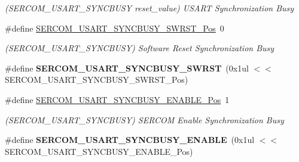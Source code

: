 \begin{DoxyCompactItemize}
\begin{DoxyCompactList}\small\item\em (S\+E\+R\+C\+O\+M\+\_\+\+U\+S\+A\+R\+T\+\_\+\+S\+Y\+N\+C\+B\+U\+S\+Y reset\+\_\+value) U\+S\+A\+R\+T Synchronization Busy \end{DoxyCompactList}\item 
\hypertarget{group___s_a_m_l21___s_e_r_c_o_m_ga02616f7f7ba7269e23c1beee065d41e2}{}\#define \hyperlink{group___s_a_m_l21___s_e_r_c_o_m_ga02616f7f7ba7269e23c1beee065d41e2}{S\+E\+R\+C\+O\+M\+\_\+\+U\+S\+A\+R\+T\+\_\+\+S\+Y\+N\+C\+B\+U\+S\+Y\+\_\+\+S\+W\+R\+S\+T\+\_\+\+Pos}~0\label{group___s_a_m_l21___s_e_r_c_o_m_ga02616f7f7ba7269e23c1beee065d41e2}

\begin{DoxyCompactList}\small\item\em (S\+E\+R\+C\+O\+M\+\_\+\+U\+S\+A\+R\+T\+\_\+\+S\+Y\+N\+C\+B\+U\+S\+Y) Software Reset Synchronization Busy \end{DoxyCompactList}\item 
\hypertarget{group___s_a_m_l21___s_e_r_c_o_m_gae87d09ebe0ef63c3b76fc785797bd1d6}{}\#define {\bfseries S\+E\+R\+C\+O\+M\+\_\+\+U\+S\+A\+R\+T\+\_\+\+S\+Y\+N\+C\+B\+U\+S\+Y\+\_\+\+S\+W\+R\+S\+T}~(0x1ul $<$$<$ S\+E\+R\+C\+O\+M\+\_\+\+U\+S\+A\+R\+T\+\_\+\+S\+Y\+N\+C\+B\+U\+S\+Y\+\_\+\+S\+W\+R\+S\+T\+\_\+\+Pos)\label{group___s_a_m_l21___s_e_r_c_o_m_gae87d09ebe0ef63c3b76fc785797bd1d6}

\item 
\hypertarget{group___s_a_m_l21___s_e_r_c_o_m_gaf98186a88e5c2e212b786c7415a010a6}{}\#define \hyperlink{group___s_a_m_l21___s_e_r_c_o_m_gaf98186a88e5c2e212b786c7415a010a6}{S\+E\+R\+C\+O\+M\+\_\+\+U\+S\+A\+R\+T\+\_\+\+S\+Y\+N\+C\+B\+U\+S\+Y\+\_\+\+E\+N\+A\+B\+L\+E\+\_\+\+Pos}~1\label{group___s_a_m_l21___s_e_r_c_o_m_gaf98186a88e5c2e212b786c7415a010a6}

\begin{DoxyCompactList}\small\item\em (S\+E\+R\+C\+O\+M\+\_\+\+U\+S\+A\+R\+T\+\_\+\+S\+Y\+N\+C\+B\+U\+S\+Y) S\+E\+R\+C\+O\+M Enable Synchronization Busy \end{DoxyCompactList}\item 
\hypertarget{group___s_a_m_l21___s_e_r_c_o_m_gaa275148c1745133f850ab3956f1f7498}{}\#define {\bfseries S\+E\+R\+C\+O\+M\+\_\+\+U\+S\+A\+R\+T\+\_\+\+S\+Y\+N\+C\+B\+U\+S\+Y\+\_\+\+E\+N\+A\+B\+L\+E}~(0x1ul $<$$<$ S\+E\+R\+C\+O\+M\+\_\+\+U\+S\+A\+R\+T\+\_\+\+S\+Y\+N\+C\+B\+U\+S\+Y\+\_\+\+E\+N\+A\+B\+L\+E\+\_\+\+Pos)\label{group___s_a_m_l21___s_e_r_c_o_m_gaa275148c1745133f850ab3956f1f7498}


\end{DoxyCompactItemize}
